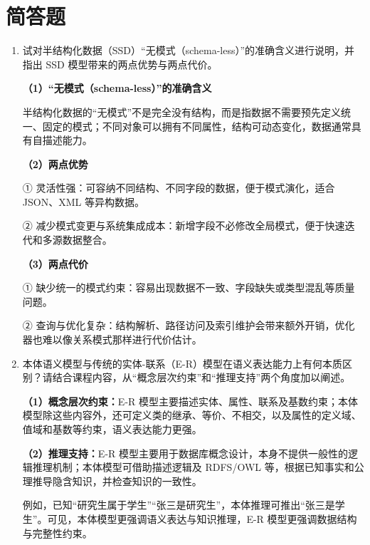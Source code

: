 \documentclass[UTF8,a4paper,11pt]{ctexart}
\newenvironment{answer}%
  {\begin{ans}\noindent{\bfseries\color{ansframe}【答案】}\hspace{0.4em}}%
  {\end{ans}}
\begin{document}
\section{简答题}

\begin{enumerate}

\item 试对半结构化数据（SSD）“无模式（schema-less）”的准确含义进行说明，并指出 SSD 模型带来的两点优势与两点代价。
\begin{answer}
\textbf{（1）“无模式（schema-less）”的准确含义}\par
半结构化数据的“无模式”不是完全没有结构，而是指数据不需要预先定义统一、固定的模式；不同对象可以拥有不同属性，结构可动态变化，数据通常具有自描述能力。\par
\textbf{（2）两点优势}\par
① 灵活性强：可容纳不同结构、不同字段的数据，便于模式演化，适合 JSON、XML 等异构数据。\par
② 减少模式变更与系统集成成本：新增字段不必修改全局模式，便于快速迭代和多源数据整合。\par
\textbf{（3）两点代价}\par
① 缺少统一的模式约束：容易出现数据不一致、字段缺失或类型混乱等质量问题。\par
② 查询与优化复杂：结构解析、路径访问及索引维护会带来额外开销，优化器也难以像关系模式那样进行代价估计。
\end{answer}

\item 本体语义模型与传统的实体-联系（E-R）模型在语义表达能力上有何本质区别？请结合课程内容，从“概念层次约束”和“推理支持”两个角度加以阐述。
\begin{answer}
\textbf{（1）概念层次约束：}E-R 模型主要描述实体、属性、联系及基数约束；本体模型除这些内容外，还可定义类的继承、等价、不相交，以及属性的定义域、值域和基数等约束，语义表达能力更强。\par
\textbf{（2）推理支持：}E-R 模型主要用于数据库概念设计，本身不提供一般性的逻辑推理机制；本体模型可借助描述逻辑及 RDFS/OWL 等，根据已知事实和公理推导隐含知识，并检查知识的一致性。\par
例如，已知“研究生属于学生”“张三是研究生”，本体推理可推出“张三是学生”。可见，本体模型更强调语义表达与知识推理，E-R 模型更强调数据结构与完整性约束。
\end{answer}


\end{enumerate}
\end{document}
